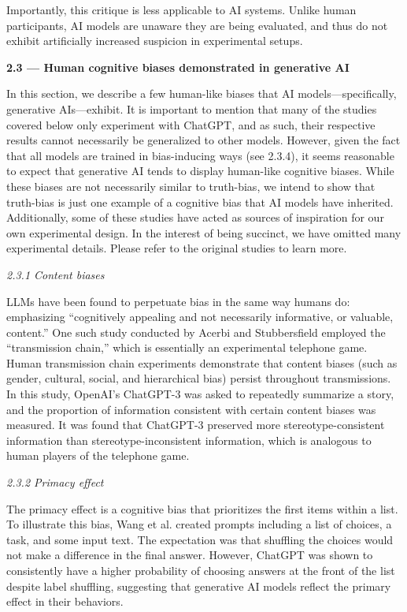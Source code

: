 \documentclass{article}
\begin{document}
Importantly, this critique is less applicable to AI systems. Unlike human participants, AI models are unaware they are being evaluated, and thus do not exhibit artificially increased suspicion in experimental setups.


\textbf{2.3 --- Human cognitive biases demonstrated in generative AI}

In this section, we describe a few human-like biases that AI models---specifically, generative AIs---exhibit. It is important to mention that many of the studies covered below only experiment with ChatGPT, and as such, their respective results cannot necessarily be generalized to other models. However, given the fact that all models are trained in bias-inducing ways (see 2.3.4), it seems reasonable to expect that generative AI tends to display human-like cognitive biases. While these biases are not necessarily similar to truth-bias, we intend to show that truth-bias is just one example of a cognitive bias that AI models have inherited. Additionally, some of these studies have acted as sources of inspiration for our own experimental design. In the interest of being succinct, we have omitted many experimental details. Please refer to the original studies to learn more.

\textit{2.3.1 Content biases}

LLMs have been found to perpetuate bias in the same way humans do: emphasizing “cognitively appealing and not necessarily informative, or valuable, content.” One such study conducted by Acerbi and Stubbersfield employed the “transmission chain,” which is essentially an experimental telephone game. Human transmission chain experiments demonstrate that content biases (such as gender, cultural, social, and hierarchical bias) persist throughout transmissions. \citep{mesoudi_multiple_2008} In this study, OpenAI’s ChatGPT-3 was asked to repeatedly summarize a story, and the proportion of information consistent with certain content biases was measured. It was found that ChatGPT-3 preserved more stereotype-consistent information than stereotype-inconsistent information, which is analogous to human players of the telephone game. \citep{acerbi_large_2023}

\textit{2.3.2 Primacy effect}

The primacy effect is a cognitive bias that prioritizes the first items within a list. To illustrate this bias, Wang et al. created prompts including a list of choices, a task, and some input text. The expectation was that shuffling the choices would not make a difference in the final answer. However, ChatGPT was shown to consistently have a higher probability of choosing answers at the front of the list despite label shuffling, suggesting that generative AI models reflect the primary effect in their behaviors. \citep{wang_primacy_2023}
\end{document}
